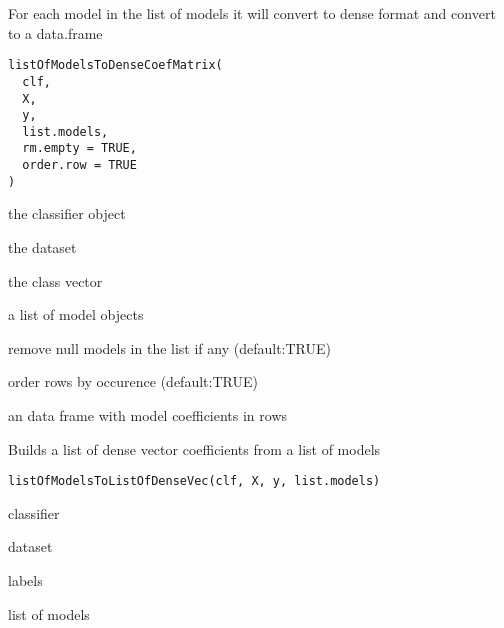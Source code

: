 \documentclass[a4paper]{book}
\begin{document}
%
\begin{Description}
For each model in the list of models it will convert to dense format and convert to a data.frame
\end{Description}
%
\begin{Usage}
\begin{verbatim}
listOfModelsToDenseCoefMatrix(
  clf,
  X,
  y,
  list.models,
  rm.empty = TRUE,
  order.row = TRUE
)
\end{verbatim}
\end{Usage}
%
\begin{Arguments}
\begin{ldescription}
\item[\code{clf:}] the classifier object

\item[\code{X:}] the dataset

\item[\code{y:}] the class vector

\item[\code{list.model:}] a list of model objects

\item[\code{rm.empty:}] remove null models in the list if any (default:TRUE)

\item[\code{order.row:}] order rows by occurence (default:TRUE)
\end{ldescription}
\end{Arguments}
%
\begin{Value}
an data frame with model coefficients in rows
\end{Value}
%
\begin{Description}
Builds a list of dense vector coefficients from a list of models
\end{Description}
%
\begin{Usage}
\begin{verbatim}
listOfModelsToListOfDenseVec(clf, X, y, list.models)
\end{verbatim}
\end{Usage}
%
\begin{Arguments}
\begin{ldescription}
\item[\code{clf:}] classifier

\item[\code{X:}] dataset

\item[\code{y:}] labels

\item[\code{list.models:}] list of models
\end{ldescription}
\end{Arguments}
\end{document}

